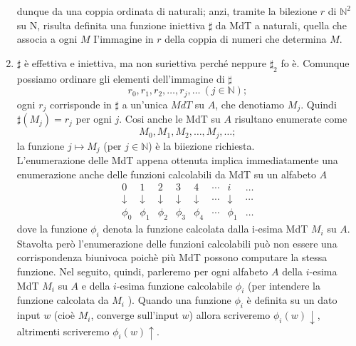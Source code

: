 \begin{enumerate}
          dunque da una coppia ordinata di naturali; anzi, tramite la bilezione $r$
          di $\mathbb{N}^2$ su $\mathrm{N}$, risulta definita una funzione iniettiva
          $\sharp$ da MdT a naturali, quella che associa a ogni $M$ I'immagine in $r$
          della coppia di numeri che determina $M$.
    \item $\sharp$ è effettiva e
          iniettiva, ma non suriettiva perché neppure $\sharp_2$ fo è. Comunque
          possiamo ordinare gli elementi dell'immagine di $\sharp$
          $$
              r_0, r_1, r_2, \ldots, r_j, \ldots \ (j \in \mathbb{N}) ;
          $$
          ogni $r_j$ corrisponde in $\sharp$ a un'unica $MdT$ su $A$, che denotiamo
          $M_j$. Quindi $\sharp\left(M_j\right)=r_j$ per ogni $j$. Cosi anche le MdT
          su $A$ risultano enumerate come
          $$
              M_0, M_1, M_2, \ldots, M_j, \ldots ;
          $$
          la funzione $j \mapsto M_j$ (per $j \in \mathbb{N}$) è la biiezione richiesta.\\
          L'enumerazione delle MdT appena ottenuta implica immediatamente una enumerazione
          anche delle funzioni calcolabili da MdT su un alfabeto $A$
          $$
              \begin{array}{cccccccc}0
                             & 1          & 2      & 3          & 4      & \cdots & i & \ldots \\ \downarrow & \downarrow & \downarrow &
                  \downarrow & \downarrow & \cdots & \downarrow & \cdots                       \\ \phi_0 & \phi_1 & \phi_2 &
                  \phi_3     & \phi_4     & \cdots & \phi_1     & \ldots\end{array}
          $$
          dove la funzione $\phi_i$ denota la funzione calcolata dalla i-esima MdT
          $M_i$ su $A$. Stavolta però l'enumerazione delle funzioni calcolabili può
          non essere una corrispondenza biunivoca poichè più MdT possono computare
          la stessa funzione. Nel seguito, quindi, parleremo per ogni alfabeto $A$
          della $i$-esima MdT $M_i$ su $A$ e della $i$-esima funzione calcolabile $\phi_i$
          (per intendere la funzione calcolata da $M_i$ ). Quando una funzione
          $\phi_i$ è definita su un dato input $w$ (cioè $M_i$, converge sull'input $w$)
          allora scriveremo $\phi_i(w) \downarrow$, altrimenti scriveremo
          $\phi_i(w) \uparrow$.
\end{enumerate}